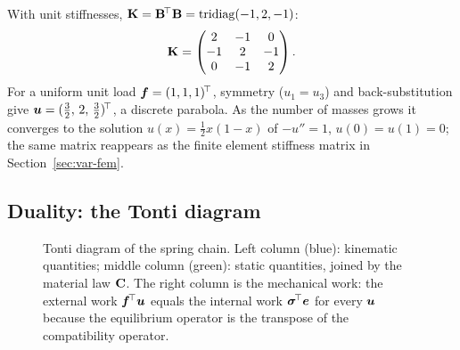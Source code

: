 With unit stiffnesses, $\mathbf{K}=\mathbf{B}^{\!\top}\mathbf{B}=\operatorname{tridiag}(-1,2,-1)$:
\[
  \mathbf{K}=\begin{pmatrix} 2 & -1 & 0 \\ -1 & 2 & -1 \\ 0 & -1 & 2 \end{pmatrix}.
\]
For a uniform unit load $\bm{f}=(1,1,1)^{\!\top}$, symmetry ($u_1=u_3$) and
back-substitution give $\bm{u}=(\tfrac32,\,2,\,\tfrac32)^{\!\top}$, a discrete
parabola. As the number of masses grows it converges to the solution
$u(x)=\tfrac12x(1-x)$ of $-u''=1$, $u(0)=u(1)=0$; the same matrix reappears as
the finite element stiffness matrix in Section~\ref{sec:var-fem}.

\subsection{Duality: the Tonti diagram}
%
\begin{figure}[h]
\centering
{}
\caption{Tonti diagram of the spring chain. Left column (blue): kinematic
quantities; middle column (green): static quantities, joined by the material law
$\mathbf{C}$. The right column is the mechanical work: the external work
$\bm{f}^{\!\top}\bm{u}$ equals the internal work $\bm{\sigma}^{\!\top}\bm{e}$ for every $\bm{u}$
because the equilibrium operator is the transpose of the compatibility
operator.}
\label{fig:tonti-discrete}
\end{figure}
